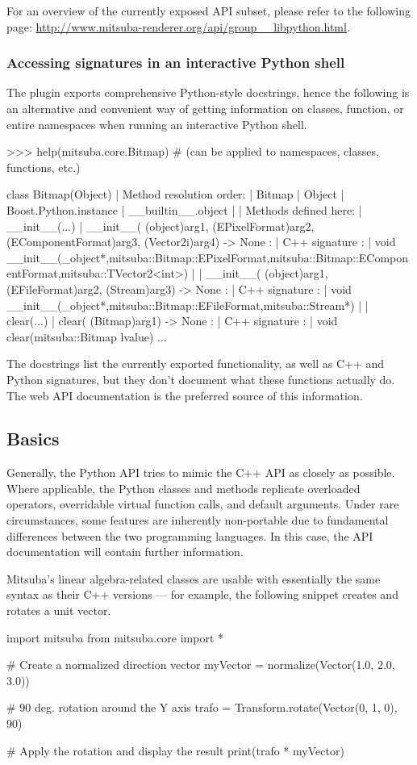 For an overview of the currently exposed API subset, please refer
to the following page: \url{http://www.mitsuba-renderer.org/api/group__libpython.html}.

\subsubsection*{Accessing signatures in an interactive Python shell}
The plugin exports comprehensive Python-style docstrings, hence
the following is an alternative and convenient way of getting information on
classes, function, or entire namespaces when running an interactive Python shell.
\begin{shell}
>>> help(mitsuba.core.Bitmap) # (can be applied to namespaces, classes, functions, etc.)

 class Bitmap(Object)
  |  Method resolution order:
  |      Bitmap
  |      Object
  |      Boost.Python.instance
  |      __builtin__.object
  |
  |  Methods defined here:
  |  __init__(...)
  |      __init__( (object)arg1, (EPixelFormat)arg2, (EComponentFormat)arg3, (Vector2i)arg4) -> None :
  |          C++ signature :
  |              void __init__(_object*,mitsuba::Bitmap::EPixelFormat,mitsuba::Bitmap::EComponentFormat,mitsuba::TVector2<int>)
  |
  |      __init__( (object)arg1, (EFileFormat)arg2, (Stream)arg3) -> None :
  |          C++ signature :
  |              void __init__(_object*,mitsuba::Bitmap::EFileFormat,mitsuba::Stream*)
  |
  |  clear(...)
  |      clear( (Bitmap)arg1) -> None :
  |          C++ signature :
  |              void clear(mitsuba::Bitmap {lvalue})
...
\end{shell}
The docstrings list the currently exported functionality, as well as C++ and Python signatures, but they
don't document what these functions actually do. The web API documentation is
the preferred source of this information.

\subsection{Basics}
Generally, the Python API tries to mimic the C++ API as closely as possible.
Where applicable, the Python classes and methods replicate overloaded operators,
overridable virtual function calls, and default arguments. Under rare circumstances,
some features are inherently non-portable due to fundamental differences between the
two programming languages. In this case, the API documentation will contain further
information.

Mitsuba's linear algebra-related classes are usable with essentially the
same syntax as their C++ versions --- for example, the following snippet
creates and rotates a unit vector.
\begin{python}
import mitsuba
from mitsuba.core import *

# Create a normalized direction vector
myVector = normalize(Vector(1.0, 2.0, 3.0))

# 90 deg. rotation around the Y axis
trafo = Transform.rotate(Vector(0, 1, 0), 90)

# Apply the rotation and display the result
print(trafo * myVector)
\end{python}

